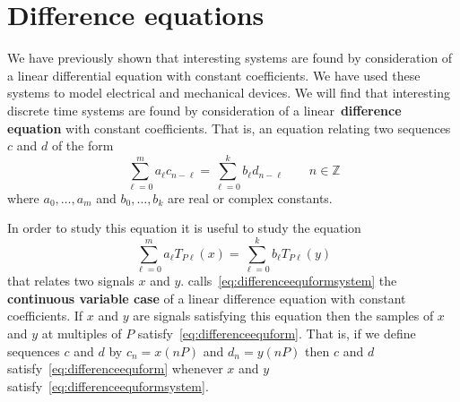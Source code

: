 \documentclass[11pt,a4paper]{book}
\theoremstyle{plain}
\numberwithin{equation}{section}
\newcommand{\ints}{{\mathbb Z}}
\newcommand{\term}{\textbf}
\begin{document}
\section{Difference equations}\label{sec:difference-equations}

We have previously shown that interesting systems are found by consideration of a linear differential equation with constant coefficients.  We have used these systems to model electrical and mechanical devices.  We will find that interesting discrete time systems are found by consideration of a linear~\term{difference equation} with constant coefficients.  That is, an equation relating two sequences $c$ and $d$ of the form
\begin{equation}\label{eq:differenceequform}
\sum_{\ell=0}^{m} a_\ell c_{n - \ell} = \sum_{\ell=0}^{k} b_\ell d_{n - \ell} \qquad n \in \ints
\end{equation}
where $a_0,\dots,a_m$ and $b_0,\dots,b_k$ are real or complex constants.

In order to study this equation it is useful to study the equation
\begin{equation}\label{eq:differenceequformsystem}
\sum_{\ell=0}^{m} a_\ell T_{P\ell}(x) = \sum_{\ell=0}^{k} b_\ell T_{P\ell}(y)
\end{equation}
that relates two signals $x$ and $y$.  \citet[Sec.~9.5]{Zemanian_dist_theory_1965} calls~\eqref{eq:differenceequformsystem} the \term{continuous variable case} of a linear difference equation with constant coefficients.  If $x$ and $y$ are signals satisfying this equation then the samples of $x$ and $y$ at multiples of $P$ satisfy~\eqref{eq:differenceequform}.  That is, if we define sequences $c$ and $d$ by $c_n = x(nP)$ and $d_n = y(nP)$ then $c$ and $d$ satisfy~\eqref{eq:differenceequform} whenever $x$ and $y$ satisfy~\eqref{eq:differenceequformsystem}.
\end{document}
